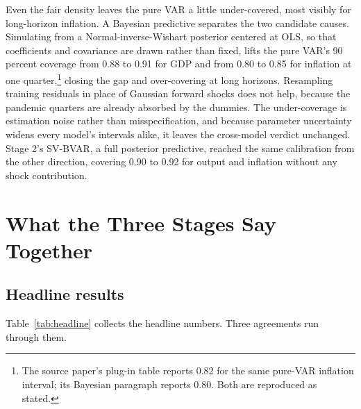 \documentclass[conference]{IEEEtran}
\begin{document}
Even the fair density leaves the pure VAR a little under-covered, most visibly for long-horizon inflation. A Bayesian predictive separates the two candidate causes. Simulating from a Normal-inverse-Wishart posterior centered at OLS, so that coefficients and covariance are drawn rather than fixed, lifts the pure VAR's 90 percent coverage from 0.88 to 0.91 for GDP and from 0.80 to 0.85 for inflation at one quarter,\footnote{The source paper's plug-in table reports 0.82 for the same pure-VAR inflation interval; its Bayesian paragraph reports 0.80. Both are reproduced as stated.} closing the gap and over-covering at long horizons. Resampling training residuals in place of Gaussian forward shocks does not help, because the pandemic quarters are already absorbed by the dummies. The under-coverage is estimation noise rather than misspecification, and because parameter uncertainty widens every model's intervals alike, it leaves the cross-model verdict unchanged. Stage 2's SV-BVAR, a full posterior predictive, reached the same calibration from the other direction, covering 0.90 to 0.92 for output and inflation without any shock contribution.

\section{What the Three Stages Say Together}

\subsection{Headline results}
Table~\ref{tab:headline} collects the headline numbers. Three agreements run through them.
\end{document}
